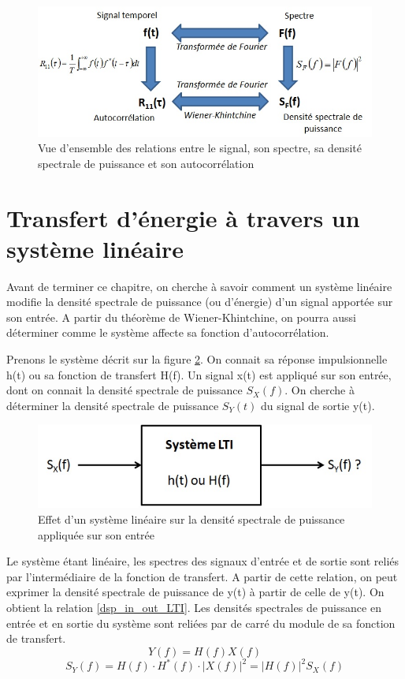	\begin{figure}[h!]
		\centering
		\includegraphics[scale=0.7]{images/Relations_f_F_R_S.jpg}
		\caption{Vue d'ensemble des relations entre le signal, son spectre, sa densité spectrale de puissance et son autocorrélation}	
		\label{Fig:Relations_f_F_R_S.jpg} 
	\end{figure}
	
	


	\section{Transfert d'énergie à travers un système linéaire}
	Avant de terminer ce chapitre, on cherche à savoir comment un système linéaire modifie la densité spectrale de puissance (ou d'énergie) d'un signal apportée sur son entrée. A partir du théorème de Wiener-Khintchine, on pourra aussi déterminer comme le système affecte sa fonction d'autocorrélation.
	
	Prenons le système décrit sur la figure \ref{Fig:Syst_LTI_dsp}. On connait sa réponse impulsionnelle h(t) ou sa fonction de transfert H(f). Un signal x(t) est appliqué sur son entrée, dont on connait la densité spectrale de puissance $S_{X}(f)$. On cherche à déterminer la densité spectrale de puissance $S_{Y}(t)$ du signal de sortie y(t). 
	\begin{figure}[h!]
		\centering
		\includegraphics[scale=0.7]{images/Syst_LTI_dsp.jpg}
		\caption{Effet d'un système linéaire sur la densité spectrale de puissance appliquée sur son entrée}	
		\label{Fig:Syst_LTI_dsp} 
	\end{figure}
	
	Le système étant linéaire, les spectres des signaux d'entrée et de sortie sont reliés par l'intermédiaire de la fonction de transfert. A partir de cette relation, on peut exprimer la densité spectrale de puissance de y(t) à partir de celle de y(t). On obtient la relation \ref{dsp_in_out_LTI}. Les densités spectrales de puissance en entrée et en sortie du système sont reliées par de carré du module de sa fonction de transfert.
	\begin{equation*}
	Y(f)=H(f)X(f)
	\end{equation*} 
	\begin{equation}\label{dsp_in_out_LTI}
	S_{Y}(f)=H(f)\cdot H^{*}(f) \cdot |X(f)|^{2}=|H(f)|^{2}S_{X}(f)
	\end{equation}
	
